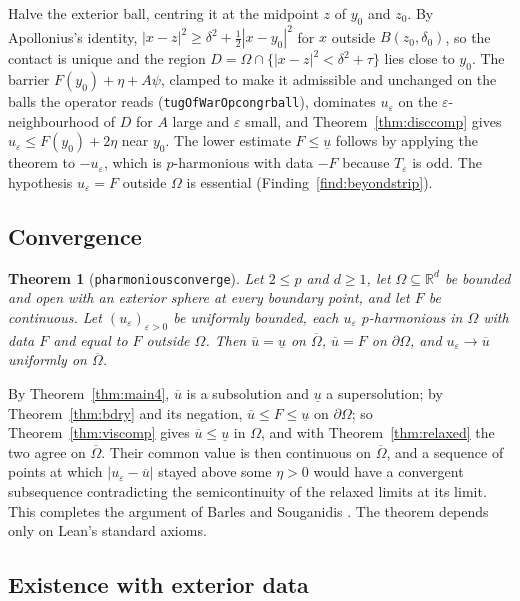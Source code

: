 \documentclass[11pt,reqno]{amsart}
\newcommand{\LEANREF}[1]{\texttt{\small\def\_{\textunderscore\allowbreak}#1}}
\newcommand{\R}{\mathbb{R}}
\newcommand{\eps}{\varepsilon}
\newcommand{\Op}{T_\eps}
\theoremstyle{plain}
\newtheorem{theorem}{Theorem}[section]
\theoremstyle{definition}
\begin{document}
Halve the exterior ball, centring it at the midpoint $z$ of $y_0$ and $z_0$. By
Apollonius's identity,
$|x - z|^2 \ge \delta^2 + \tfrac12|x - y_0|^2$ for $x$ outside $B(z_0, \delta_0)$,
so the contact is unique and the region
$D = \Omega \cap \{|x - z|^2 < \delta^2 + \tau\}$ lies close to $y_0$. The
barrier $F(y_0) + \eta + A\psi$, clamped to make it admissible and unchanged on
the balls the operator reads (\LEANREF{tugOfWarOp\_congr\_ball}), dominates
$u_\eps$ on the $\eps$-neighbourhood of $D$ for $A$ large and $\eps$ small, and
Theorem~\ref{thm:disccomp} gives $u_\eps \le F(y_0) + 2\eta$ near $y_0$. The lower
estimate $F \le \underline u$ follows by applying the theorem to $-u_\eps$, which
is $p$-harmonious with data $-F$ because $\Op$ is odd. The hypothesis
$u_\eps = F$ outside $\Omega$ is essential (Finding~\ref{find:beyondstrip}).

\subsection{Convergence}

\begin{theorem}[\LEANREF{pharmonious\_converge}]\label{thm:main}
Let $2 \le p$ and $d \ge 1$, let $\Omega \subseteq \R^d$ be bounded and open
with an exterior sphere at every boundary point, and let $F$ be continuous. Let
$(u_\eps)_{\eps > 0}$ be uniformly bounded, each $u_\eps$ $p$-harmonious in
$\Omega$ with data $F$ and equal to $F$ outside $\Omega$. Then
$\overline u = \underline u$ on $\overline\Omega$, $\overline u = F$ on
$\partial\Omega$, and $u_\eps \to \overline u$ uniformly on $\overline\Omega$.
\end{theorem}

By Theorem~\ref{thm:main4}, $\overline u$ is a subsolution and $\underline u$ a
supersolution; by Theorem~\ref{thm:bdry} and its negation,
$\overline u \le F \le \underline u$ on $\partial\Omega$; so
Theorem~\ref{thm:viscomp} gives $\overline u \le \underline u$ in $\Omega$, and
with Theorem~\ref{thm:relaxed} the two agree on $\overline\Omega$. Their common
value is then continuous on $\overline\Omega$, and a sequence of points at which
$|u_\eps - \overline u|$ stayed above some $\eta > 0$ would have a convergent
subsequence contradicting the semicontinuity of the relaxed limits at its
limit. This completes the argument of Barles and Souganidis \cite{BS91}. The
theorem depends only on Lean's standard axioms.

\subsection{Existence with exterior data}\label{ssec:dirichlet}
\end{document}
